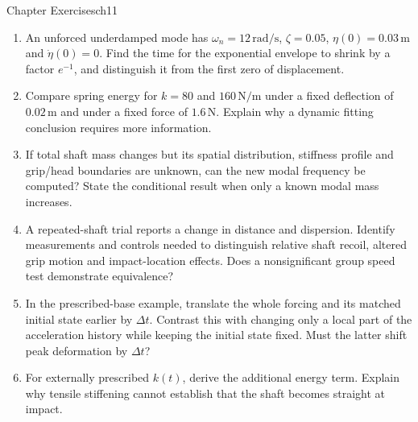 \begin{exercises}{Chapter Exercises}{ch11}
\begin{enumerate}
\item An unforced underdamped mode has $\omega_n=12\,\mathrm{rad/s}$, $\zeta=0.05$, $\eta(0)=0.03\,\mathrm m$ and $\dot\eta(0)=0$. Find the time for the exponential envelope to shrink by a factor $e^{-1}$, and distinguish it from the first zero of displacement.
\item Compare spring energy for $k=80$ and $160\,\mathrm{N/m}$ under a fixed deflection of $0.02\,\mathrm m$ and under a fixed force of $1.6\,\mathrm N$. Explain why a dynamic fitting conclusion requires more information.
\item If total shaft mass changes but its spatial distribution, stiffness profile and grip/head boundaries are unknown, can the new modal frequency be computed? State the conditional result when only a known modal mass increases.
\item A repeated-shaft trial reports a change in distance and dispersion. Identify measurements and controls needed to distinguish relative shaft recoil, altered grip motion and impact-location effects. Does a nonsignificant group speed test demonstrate equivalence?
\item In the prescribed-base example, translate the whole forcing and its matched initial state earlier by $\Delta t$. Contrast this with changing only a local part of the acceleration history while keeping the initial state fixed. Must the latter shift peak deformation by $\Delta t$?
\item For externally prescribed $k(t)$, derive the additional energy term. Explain why tensile stiffening cannot establish that the shaft becomes straight at impact.
\end{enumerate}
\end{exercises}

